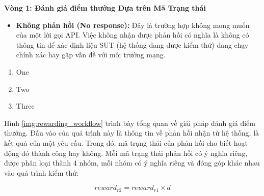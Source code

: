 
\noindent\textbf{Vòng 1: Đánh giá điểm thưởng Dựa trên Mã Trạng thái}

\begin{itemize}
  \item \textbf{Không phản hồi (No response):} Đây là trường hợp không mong muốn của một lời gọi API. Việc không nhận được phản hồi có nghĩa là không có thông tin để xác định liệu SUT (hệ thống đang được kiểm thử) đang chạy chính xác hay gặp vấn đề với môi trường mạng.
\end{itemize}


\begin{enumerate}
  \item One
  \item Two
  \item Three
\end{enumerate}



Hình \ref{img:rewarding_workflow}  trình bày tổng quan về giải pháp đánh giá điểm thưởng. Đầu vào của quá trình này là thông tin về phản hồi nhận từ hệ thống, là kết quả của một yêu cầu. Trong đó, mã trạng thái của phản hồi cho biết hoạt động đó thành công hay không. Mỗi mã trạng thái phản hồi có ý nghĩa riêng, được phân loại thành 4 nhóm, mỗi nhóm có ý nghĩa riêng và đóng góp khác nhau vào quá trình kiểm thử:


\begin{equation}
  \label{eq:reward}
      reward_{r2} = reward_{r1} \times d
  \end{equation}



